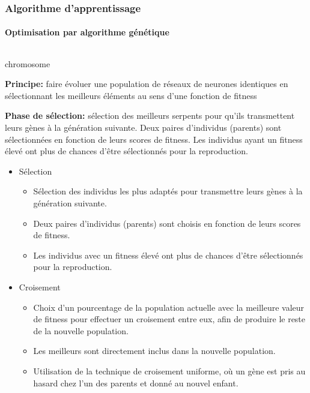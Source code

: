 \documentclass[10pt]{beamer}
\begin{document}
\begin{frame}
\frametitle{Algorithme d'apprentissage}
\framesubtitle{Optimisation par algorithme génétique}
\begin{columns}[T]
\begin{column}{0.60\textwidth}
\footnotesize

chromosome

\textbf{Principe:} faire évoluer une population de réseaux de neurones identiques en sélectionnant les meilleurs éléments au sens d'une fonction de fitness

\textbf{Phase de sélection:} sélection des meilleurs serpents pour qu'ils transmettent leurs gènes à la génération suivante. Deux paires d'individus (parents) sont sélectionnées en fonction de leurs scores de fitness. Les individus ayant un fitness élevé ont plus de chances d'être sélectionnés pour la reproduction.

\begin{itemize}
  \item Sélection
    \begin{itemize}
      \item Sélection des individus les plus adaptés pour transmettre leurs gènes à la génération suivante.
      \item Deux paires d'individus (parents) sont choisis en fonction de leurs scores de fitness.
      \item Les individus avec un fitness élevé ont plus de chances d'être sélectionnés pour la reproduction.
    \end{itemize}

  \item Croisement
    \begin{itemize}
      \item Choix d'un pourcentage de la population actuelle avec la meilleure valeur de fitness pour effectuer un croisement entre eux, afin de produire le reste de la nouvelle population.
      \item Les meilleurs sont directement inclus dans la nouvelle population.
      \item Utilisation de la technique de croisement uniforme, où un gène est pris au hasard chez l'un des parents et donné au nouvel enfant.
    \end{itemize}


\end{itemize}
\end{column}
\end{columns}
\end{frame}
\end{document}
